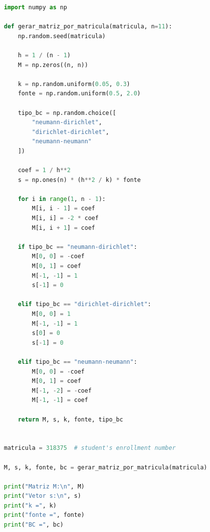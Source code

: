 \begin{lstlisting}[language=Python, caption={Generation of the finite difference
system for the one-dimensional heat conduction problem.}, label={lst:code2}]
import numpy as np

def gerar_matriz_por_matricula(matricula, n=11):
    np.random.seed(matricula)

    h = 1 / (n - 1)
    M = np.zeros((n, n))

    k = np.random.uniform(0.05, 0.3)
    fonte = np.random.uniform(0.5, 2.0)

    tipo_bc = np.random.choice([
        "neumann-dirichlet",
        "dirichlet-dirichlet",
        "neumann-neumann"
    ])

    coef = 1 / h**2
    s = np.ones(n) * (h**2 / k) * fonte

    for i in range(1, n - 1):
        M[i, i - 1] = coef
        M[i, i] = -2 * coef
        M[i, i + 1] = coef

    if tipo_bc == "neumann-dirichlet":
        M[0, 0] = -coef
        M[0, 1] = coef
        M[-1, -1] = 1
        s[-1] = 0

    elif tipo_bc == "dirichlet-dirichlet":
        M[0, 0] = 1
        M[-1, -1] = 1
        s[0] = 0
        s[-1] = 0

    elif tipo_bc == "neumann-neumann":
        M[0, 0] = -coef
        M[0, 1] = coef
        M[-1, -2] = -coef
        M[-1, -1] = coef

    return M, s, k, fonte, tipo_bc


matricula = 318375  # student's enrollment number

M, s, k, fonte, bc = gerar_matriz_por_matricula(matricula)

print("Matriz M:\n", M)
print("Vetor s:\n", s)
print("k =", k)
print("fonte =", fonte)
print("BC =", bc)
\end{lstlisting}